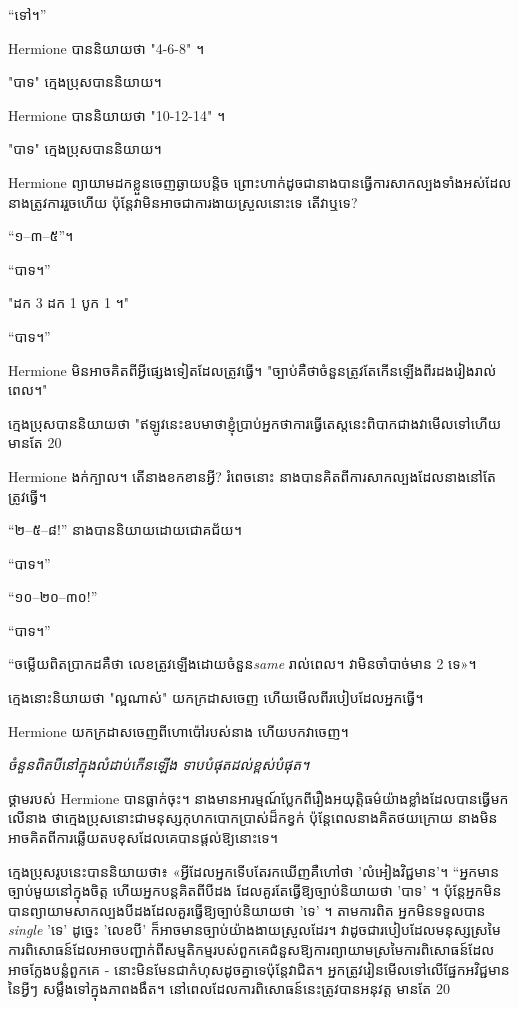 “ទៅ។”

Hermione បាននិយាយថា "4-6-8" ។

"បាទ" ក្មេងប្រុសបាននិយាយ។

Hermione បាននិយាយថា "10-12-14" ។

"បាទ" ក្មេងប្រុសបាននិយាយ។

Hermione ព្យាយាម​ដក​ខ្លួន​ចេញ​ឆ្ងាយ​បន្តិច ព្រោះ​ហាក់​ដូច​ជា​នាង​បាន​ធ្វើ​ការ​សាកល្បង​ទាំង​អស់​ដែល​នាង​ត្រូវ​ការ​រួច​ហើយ ប៉ុន្តែ​វា​មិន​អាច​ជា​ការ​ងាយ​ស្រួល​នោះ​ទេ តើ​វា​ឬ​ទេ?

“១–៣–៥”។

“បាទ។”

"ដក 3 ដក 1 បូក 1 ។"

“បាទ។”

Hermione មិនអាចគិតពីអ្វីផ្សេងទៀតដែលត្រូវធ្វើ។ "ច្បាប់គឺថាចំនួនត្រូវតែកើនឡើងពីរដងរៀងរាល់ពេល។"

ក្មេងប្រុសបាននិយាយថា "ឥឡូវនេះឧបមាថាខ្ញុំប្រាប់អ្នកថាការធ្វើតេស្តនេះពិបាកជាងវាមើលទៅហើយមានតែ 20%

Hermione ងក់ក្បាល។ តើនាងខកខានអ្វី? រំពេចនោះ នាងបានគិតពីការសាកល្បងដែលនាងនៅតែត្រូវធ្វើ។

“២–៥–៨!” នាងបាននិយាយដោយជោគជ័យ។

“បាទ។”

“១០–២០–៣០!”

“បាទ។”

“ចម្លើយពិតប្រាកដគឺថា លេខត្រូវឡើងដោយចំនួន\emph{same} រាល់ពេល។ វា​មិន​ចាំបាច់​មាន 2 ទេ»។

ក្មេងនោះនិយាយថា "ល្អណាស់" យកក្រដាសចេញ ហើយមើលពីរបៀបដែលអ្នកធ្វើ។

Hermione យកក្រដាសចេញពីហោប៉ៅរបស់នាង ហើយបកវាចេញ។

\emph{ចំនួនពិតបីនៅក្នុងលំដាប់កើនឡើង ទាបបំផុតដល់ខ្ពស់បំផុត។}

ថ្គាមរបស់ Hermione បានធ្លាក់ចុះ។ នាង​មាន​អារម្មណ៍​ប្លែក​ពី​រឿង​អយុត្តិធម៌​យ៉ាង​ខ្លាំង​ដែល​បាន​ធ្វើ​មក​លើ​នាង ថា​ក្មេង​ប្រុស​នោះ​ជា​មនុស្ស​កុហក​បោកប្រាស់​ដ៏​កខ្វក់ ប៉ុន្តែ​ពេល​នាង​គិត​ថយ​ក្រោយ នាង​មិន​អាច​គិត​ពី​ការ​ឆ្លើយ​តប​ខុស​ដែល​គេ​បាន​ផ្តល់​ឱ្យ​នោះ​ទេ។

ក្មេង​ប្រុស​រូប​នេះ​បាន​និយាយ​ថា៖ «អ្វី​ដែល​អ្នក​ទើប​តែ​រក​ឃើញ​គឺ​ហៅ​ថា 'លំអៀង​វិជ្ជមាន'។ “អ្នកមានច្បាប់មួយនៅក្នុងចិត្ត ហើយអ្នកបន្តគិតពីបីដង ដែលគួរតែធ្វើឱ្យច្បាប់និយាយថា 'បាទ' ។ ប៉ុន្តែ​អ្នក​មិន​បាន​ព្យាយាម​សាកល្បង​បី​ដង​ដែល​គួរ​ធ្វើ​ឱ្យ​ច្បាប់​និយាយថា 'ទេ' ។ តាមការពិត អ្នកមិនទទួលបាន \emph{single} 'ទេ' ដូច្នេះ 'លេខបី' ក៏អាចមានច្បាប់យ៉ាងងាយស្រួលដែរ។ វាដូចជារបៀបដែលមនុស្សស្រមៃការពិសោធន៍ដែលអាចបញ្ជាក់ពីសម្មតិកម្មរបស់ពួកគេជំនួសឱ្យការព្យាយាមស្រមៃការពិសោធន៍ដែលអាចក្លែងបន្លំពួកគេ - នោះមិនមែនជាកំហុសដូចគ្នាទេប៉ុន្តែវាជិត។ អ្នក​ត្រូវ​រៀន​មើល​ទៅ​លើ​ផ្នែក​អវិជ្ជមាន​នៃ​អ្វី​ៗ សម្លឹង​ទៅ​ក្នុង​ភាព​ងងឹត។ នៅពេលដែលការពិសោធន៍នេះត្រូវបានអនុវត្ត មានតែ 20%

